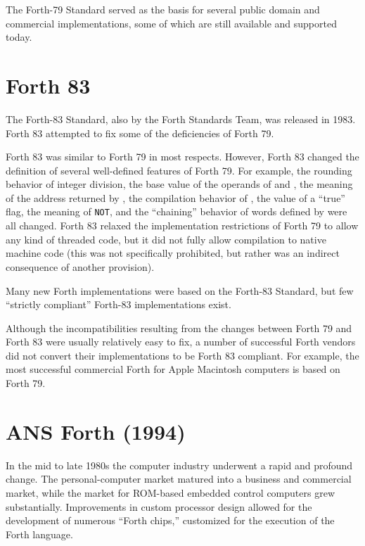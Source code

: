 The Forth-79 Standard served as the basis for several public domain
and commercial implementations, some of which are still available and
supported today.


\section{Forth 83} %

The Forth-83 Standard, also by the Forth Standards Team, was released
in 1983. Forth 83 attempted to fix some of the deficiencies of Forth
79.

Forth 83 was similar to Forth 79 in most respects. However, Forth 83
changed the definition of several well-defined features of Forth 79.
For example, the rounding behavior of integer division, the base value
of the operands of  and , the meaning of the
address returned by , the compilation behavior of ,
the value of a ``true'' flag, the meaning of \texttt{NOT}, and the
``chaining'' behavior of words defined by  were all
changed. Forth 83 relaxed the implementation restrictions of Forth 79
to allow any kind of threaded code, but it did not fully allow
compilation to native machine code (this was not specifically prohibited,
but rather was an indirect consequence of another provision).

Many new Forth implementations were based on the Forth-83 Standard, but
few ``strictly compliant'' Forth-83 implementations exist.

Although the incompatibilities resulting from the changes between
Forth 79 and Forth 83 were usually relatively easy to fix, a number
of successful Forth vendors did not convert their implementations to
be Forth 83 compliant. For example, the most successful commercial
Forth for Apple Macintosh computers is based on Forth 79.


\section{ANS Forth (1994)} %
\label{diff:ans}

In the mid to late 1980s the computer industry underwent a rapid and
profound change.  The personal-computer market matured into a business
and commercial market, while the market for ROM-based embedded control
computers grew substantially.  Improvements in custom processor design
allowed for the de\-vel\-op\-ment of numerous ``Forth chips,'' customized
for the execution of the Forth language.

